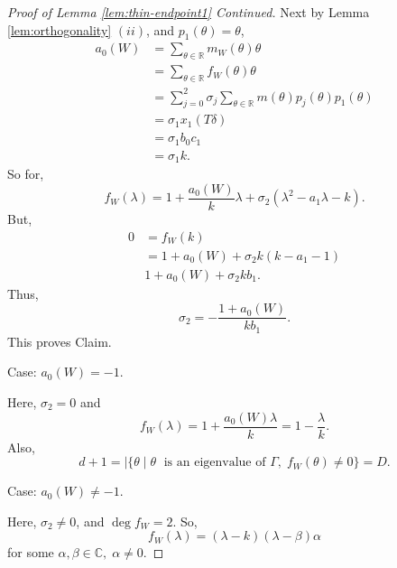 \documentclass[
]{book}
\theoremstyle{definition}
\theoremstyle{definition}
\theoremstyle{definition}
\theoremstyle{definition}
\theoremstyle{remark}
\begin{document}
\begin{proof}[Proof of Lemma \ref{lem:thin-endpoint1} Continued]
Next by Lemma \ref{lem:orthogonality} \((ii)\), and \(p_1(\theta) = \theta\),
\begin{align}
a_0(W) & = \sum_{\theta\in \mathbb{R}}m_W(\theta)\theta\\
& = \sum_{\theta\in \mathbb{R}}f_W(\theta)\theta\\
& = \sum_{j = 0}^2\sigma_j\sum_{\theta\in \mathbb{R}}m(\theta)p_j(\theta)p_1(\theta)\\
& = \sigma_1 x_1(T\delta)\\
& = \sigma_1b_0c_1\\
& = \sigma_1 k.
\end{align}
So for,
\[f_W(\lambda) = 1 + \frac{a_0(W)}{k}\lambda + \sigma_2(\lambda^2 - a_1\lambda-k).\]
But,
\begin{align}
0 & = f_W(k)\\
& = 1 + a_0(W) + \sigma_2k(k-a_1-1)\\
& 1 + a_0(W) + \sigma_2kb_1.
\end{align}
Thus,
\[\sigma_2 = -\frac{1+a_0(W)}{kb_1}.\]
This proves Claim.

Case: \(a_0(W) = -1\).

Here, \(\sigma_2 = 0\) and
\[f_W(\lambda) = 1 + \frac{a_0(W)\lambda}{k} = 1-\frac{\lambda}{k}.\]
Also,
\[d+1 = |\{\theta \mid \theta \;\text{ is an eigenvalue of $\Gamma$}, \; f_W(\theta)\neq 0\} = D.\]

Case: \(a_0(W) \neq -1\).

Here, \(\sigma_2\neq 0\), and \(\deg f_W = 2\). So,
\[f_W(\lambda) = (\lambda - k)(\lambda - \beta)\alpha\]
for some \(\alpha, \beta\in \mathbb{C}, \; \alpha \neq 0\).


\end{proof}
\end{document}
